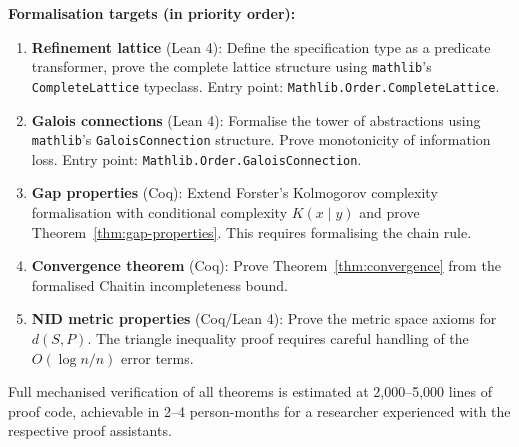 \documentclass[11pt, a4paper, logo, copyright]{googledeepmind}
\begin{document}
\textbf{Formalisation targets (in priority order):}
\begin{enumerate}
    \item \textbf{Refinement lattice} (Lean 4): Define the specification type as a predicate transformer, prove the complete lattice structure using \texttt{mathlib}'s \texttt{CompleteLattice} typeclass. Entry point: \texttt{Mathlib.Order.CompleteLattice}.
    \item \textbf{Galois connections} (Lean 4): Formalise the tower of abstractions using \texttt{mathlib}'s \texttt{GaloisConnection} structure. Prove monotonicity of information loss. Entry point: \texttt{Mathlib.Order.GaloisConnection}.
    \item \textbf{Gap properties} (Coq): Extend Forster's Kolmogorov complexity formalisation with conditional complexity $K(x \mid y)$ and prove Theorem~\ref{thm:gap-properties}. This requires formalising the chain rule.
    \item \textbf{Convergence theorem} (Coq): Prove Theorem~\ref{thm:convergence} from the formalised Chaitin incompleteness bound.
    \item \textbf{NID metric properties} (Coq/Lean 4): Prove the metric space axioms for $d(S, P)$. The triangle inequality proof requires careful handling of the $O(\log n / n)$ error terms.
\end{enumerate}

Full mechanised verification of all theorems is estimated at 2,000--5,000 lines of proof code, achievable in 2--4 person-months for a researcher experienced with the respective proof assistants.
\end{document}
